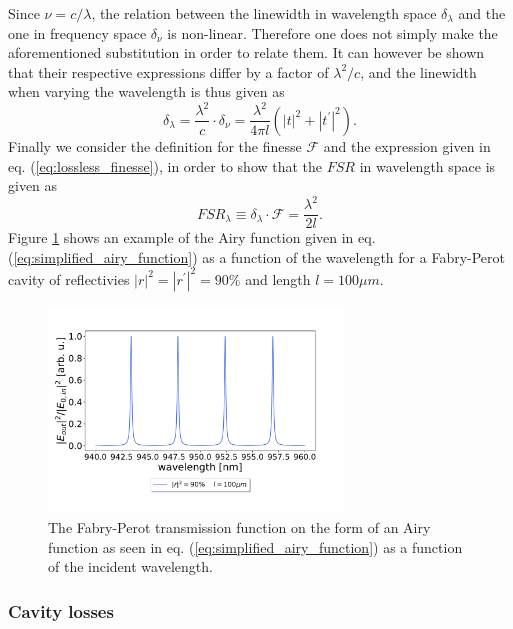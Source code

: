 Since $\nu = c / \lambda$, the relation between the linewidth in wavelength space $\delta_{\lambda}$ and the one in frequency space $\delta_{\nu}$ is non-linear. Therefore one does not simply make the aforementioned substitution in order to relate them. It can however be shown that their respective expressions differ by a factor of $\lambda^2/c$, and the linewidth when varying the wavelength is thus given as
\begin{equation}
    \delta_{\lambda} = \frac{\lambda^2}{c} \cdot \delta_{\nu} = \frac{\lambda^2}{4 \pi l} (|t|^2 + |t^{\prime}|^2).
\end{equation}
Finally we consider the definition for the finesse $\mathcal{F}$ and the expression given in eq. (\ref{eq:lossless_finesse}), in order to show that the $FSR$ in wavelength space is given as 
\begin{equation}
    FSR_{\lambda} \equiv \delta_{\lambda} \cdot \mathcal{F} =  \frac{\lambda^2}{2l}.
\end{equation}
Figure \ref{fig:airy_trans_vs_wavelength} shows an example of the Airy function given in eq. (\ref{eq:simplified_airy_function}) as a function of the wavelength for a Fabry-Perot cavity of reflectivies $|r|^2 = |r^{\prime}|^2 = 90\%$ and length $l=100 \mu m$.

\begin{figure}[h!]
    \centering
    \includegraphics[width=0.7\textwidth]{figures/airy_function_vs_wavelength.pdf}
    \caption{The Fabry-Perot transmission function on the form of an Airy function as seen in eq. (\ref{eq:simplified_airy_function}) as a function of the incident wavelength.}
    \label{fig:airy_trans_vs_wavelength}
\end{figure}

\subsubsection{Cavity losses}

